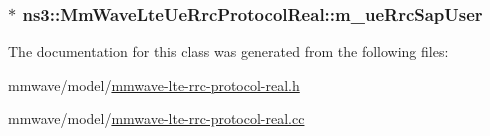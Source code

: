 \subsubsection[{\texorpdfstring{m\+\_\+ue\+Rrc\+Sap\+User}{m_ueRrcSapUser}}]{$\ast$ ns3\+::\+Mm\+Wave\+Lte\+Ue\+Rrc\+Protocol\+Real\+::m\+\_\+ue\+Rrc\+Sap\+User\hspace{0.3cm}{\ttfamily [private]}}\hypertarget{classns3_1_1MmWaveLteUeRrcProtocolReal_a96c160bbef1f7ca98bdf18f29f202658}{}\label{classns3_1_1MmWaveLteUeRrcProtocolReal_a96c160bbef1f7ca98bdf18f29f202658}


The documentation for this class was generated from the following files\+:\begin{DoxyCompactItemize}
\item 
mmwave/model/\hyperlink{mmwave-lte-rrc-protocol-real_8h}{mmwave-\/lte-\/rrc-\/protocol-\/real.\+h}\item 
mmwave/model/\hyperlink{mmwave-lte-rrc-protocol-real_8cc}{mmwave-\/lte-\/rrc-\/protocol-\/real.\+cc}\end{DoxyCompactItemize}
